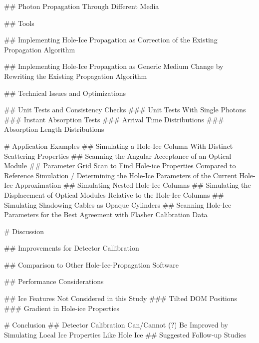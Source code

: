 
## Photon Propagation Through Different Media

## Tools

## Implementing Hole-Ice Propagation as Correction of the Existing Propagation Algorithm

## Implementing Hole-Ice Propagation as Generic Medium Change by Rewriting the Existing Propagation Algorithm

## Technical Issues and Optimizations

## Unit Tests and Consistency Checks
### Unit Tests With Single Photons
### Instant Absorption Tests
### Arrival Time Distributions
### Absorption Length Distributions

# Application Examples
## Simulating a Hole-Ice Column With Distinct Scattering Properties
## Scanning the Angular Acceptance of an Optical Module
## Parameter Grid Scan to Find Hole-ice Properties Compared to Reference Simulation / Determining the Hole-Ice Parameters of the Current Hole-Ice Approximation
## Simulating Nested Hole-Ice Columns
## Simulating the Displacement of Optical Modules Relative to the Hole-Ice Columns
## Simulating Shadowing Cables as Opaque Cylinders
## Scanning Hole-Ice Parameters for the Best Agreement with Flasher Calibration Data

# Discussion

## Improvements for Detector Callibration

## Comparison to Other Hole-Ice-Propagation Software

## Performance Considerations

## Ice Features Not Considered in this Study
### Tilted DOM Positions
### Gradient in Hole-ice Properties

# Conclusion
## Detector Calibration Can/Cannot (?) Be Improved by Simulating Local Ice Properties Like Hole Ice
## Suggested Follow-up Studies

